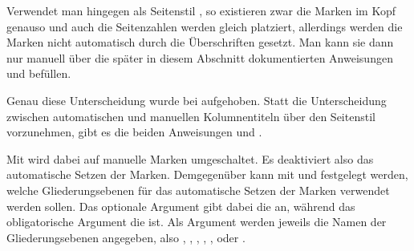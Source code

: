 {\begin{Explain}
      Verwendet man hingegen als Seitenstil
      , so existieren zwar die Marken im Kopf
      genauso und auch die Seitenzahlen werden gleich platziert, allerdings
      werden die Marken nicht automatisch durch die Überschriften gesetzt. Man
      kann sie dann nur manuell über die später in diesem Abschnitt
      dokumentierten Anweisungen
       und
       befüllen.
    \end{Explain}\par%
    Genau diese Unterscheidung wurde bei %
    \iffalse \Package{scrpage2} und nun auch bei \fi%
    \hyperref[cha:scrlayer]{}%
    aufgehoben. Statt die Unterscheidung zwischen
    automatischen und manuellen
    Kolumnentiteln über den Seitenstil vorzunehmen, gibt es die beiden
    Anweisungen  und .%
  }{%
  }%

  Mit  wird dabei auf manuelle
  Marken umgeschaltet. Es deaktiviert also das automatische Setzen der
  Marken. Demgegenüber kann mit 
  und  festgelegt werden, welche Gliederungsebenen für das
  automatische Setzen der Marken verwendet werden sollen. Das optionale
  Argument gibt dabei die  an,
  während das obligatorische Argument die  ist. Als Argument werden jeweils die Namen der Gliederungsebenen
  angegeben, also , , ,
  , ,  oder
  .


